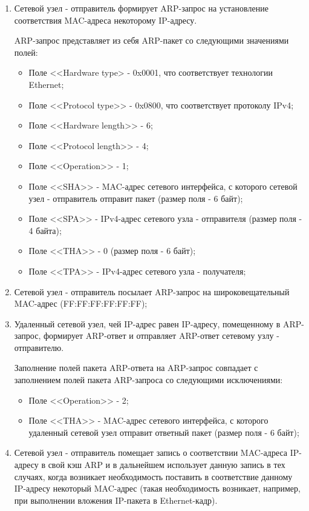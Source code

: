 	\begin{enumerate}

		\item Сетевой узел - отправитель формирует ARP-запрос на установление соответствия MAC-адреса некоторому IP-адресу.

		ARP-запрос представляет из себя ARP-пакет со следующими значениями полей:

			\begin{itemize}
			
				\item Поле <<Hardware type> - 0x0001, что соответствует технологии Ethernet;
				\item Поле <<Protocol type>> - 0x0800, что соответствует протоколу IPv4;
				\item Поле <<Hardware length>> - 6;
				\item Поле <<Protocol length>> - 4;
				\item Поле <<Operation>> - 1;
				\item Поле <<SHA>> - MAC-адрес сетевого интерфейса, с которого сетевой узел - отправитель отправит пакет (размер поля - 6 байт);
				\item Поле <<SPA>> - IPv4-адрес сетевого узла - отправителя (размер поля - 4 байта);
				\item Поле <<THA>> - 0 (размер поля - 6 байт);
				\item Поле <<TPA>> - IPv4-адрес сетевого узла - получателя;

			\end{itemize}

		\item Сетевой узел - отправитель посылает ARP-запрос на широковещательный MAC-адрес (FF:FF:FF:FF:FF:FF);

		\item Удаленный сетевой узел, чей IP-адрес равен IP-адресу, помещенному в ARP-запрос, формирует ARP-ответ и отправляет ARP-ответ
		сетевому узлу - отправителю.

		Заполнение полей пакета ARP-ответа на ARP-запрос совпадает с заполнением полей пакета ARP-запроса со следующими исключениями:

			\begin{itemize}

				\item Поле <<Operation>> - 2;
				\item Поле <<THA>> - MAC-адрес сетевого интерфейса, с которого удаленный сетевой узел отправит ответный пакет (размер поля - 6 байт);

			\end{itemize}

		\item Сетевой узел - отправитель помещает запись о соответствии MAC-адреса IP-адресу в свой кэш ARP и в дальнейшем использует
		данную запись в тех случаях, когда возникает необходимость поставить в соответствие данному IP-адресу некоторый MAC-адрес
		(такая необходимость возникает, например, при выполнении вложения IP-пакета в Ethernet-кадр).

	\end{enumerate}


